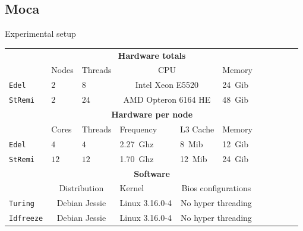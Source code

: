 \documentclass[xcolor={usenames,dvipsnames},hyperref={pdfusetitle}]{beamer}
\begin{document}
\subsection*{Moca}

\setcounter{framenumber}{\value{finalframe}}
\begin{frame}{Experimental setup}
    \small
    \begin{tabular}{lllllllllll}
        \toprule
        & \multicolumn{5}{c}{\textbf{Hardware totals}}\\
        \cmidrule(lr){2-6}
        & Nodes & Threads & \multicolumn{2}{c}{CPU} & Memory \\
        \cmidrule(lr){2-6}
        \texttt{Edel}    & $2$ & $8$  & \multicolumn{2}{c}{Intel Xeon E5520}      & \SI{24}{Gib} \\
        \texttt{StRemi} & $2$ & $24$ & \multicolumn{2}{c}{AMD Opteron 6164 HE }& \SI{48}{Gib} \\
        \midrule
        & \multicolumn{5}{c}{\textbf{Hardware per node}}\\
        \cmidrule(lr){2-6}
        & Cores & Threads & Frequency & L3 Cache & Memory \\
        \cmidrule(lr){2-6}
        \texttt{Edel}   & $4$  & $4$   & \SI{2.27}{Ghz}& \SI{8}{Mib}  & \SI{12}{Gib} \\
        \texttt{StRemi} & $12$ & $12$  & \SI{1.70}{Ghz}& \SI{12}{Mib} & \SI{24}{Gib}\\
        \midrule
        & \multicolumn{5}{c}{\textbf{Software}}\\
        \cmidrule(lr){2-6}
        & \multicolumn{2}{c}{Distribution} & Kernel &
            \multicolumn{2}{c}{Bios configurations} \\
        \cmidrule(lr){2-6}
        \texttt{Turing}   & \multicolumn{2}{c}{Debian Jessie} & Linux 3.16.0-4 &
            \multicolumn{2}{c}{No hyper threading} \\
        \texttt{Idfreeze} & \multicolumn{2}{c}{Debian Jessie} & Linux 3.16.0-4 &
            \multicolumn{2}{c}{No hyper threading}\\
        \bottomrule
    \end{tabular}
\end{frame}
\end{document}
